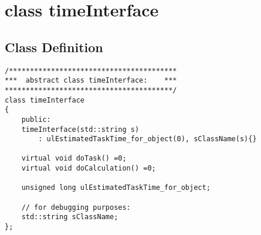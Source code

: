 \chapter{class timeInterface} %

\section{Class Definition}
\label{appendixTimeInterfaceDefinition}
\begin{lstlisting}
/****************************************
***  abstract class timeInterface:    ***
****************************************/
class timeInterface
{
	public:
	timeInterface(std::string s)  
		: ulEstimatedTaskTime_for_object(0), sClassName(s){}

	virtual void doTask() =0;
	virtual void doCalculation() =0;

	unsigned long ulEstimatedTaskTime_for_object; 

	// for debugging purposes:
	std::string sClassName;
};

\end{lstlisting}


